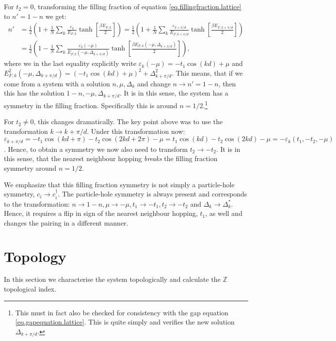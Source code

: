 For $t_2 = 0$, transforming the filling fraction of equation \eqref{eq.fillingfraction.lattice} to $n' = 1 - n$ we get:
\begin{align}
n' 	&= \frac{1}{2}\left(1 + \frac{1}{N}\sum_k \frac{\varepsilon_k}{E_{F,k}}\tanh\left[\frac{\beta E_{F,k}}{2} \right] \right) = \frac{1}{2}\left(1 + \frac{1}{N}\sum_k \frac{\varepsilon_{k + \pi/d}}{E_{F,k + \pi/d}}\tanh\left[\frac{\beta E_{F,k + \pi/d}}{2} \right] \right) \nonumber \\ 
	&= \frac{1}{2}\left(1 - \frac{1}{N}\sum_k \frac{\varepsilon_{k}(-\mu)}{E_{F,k}(-\mu, \Delta_{k + \pi/d})}\tanh\left[\frac{\beta E_{F,k}(-\mu, \Delta_{k + \pi/d})}{2} \right] \right), \nonumber
\end{align}
where we in the last equality explicitly write $\varepsilon_{k}(-\mu) = -t_1\cos(kd) + \mu$ and $E^2_{F,k}(-\mu, \Delta_{k + \pi/d}) = (-t_1\cos(kd)+\mu)^2 + \Delta^2_{k+\pi/d}$. This means, that if we come from a system with a solution $n, \mu, \Delta_k$ and change $n \to n' = 1 - n$, then this has the solution $1 - n, -\mu, \Delta_{k+\pi/d}$. It is in this sense, the system has a symmetry in the filling fraction. Specifically this is around $n = 1/2$.\footnote{This must in fact also be checked for consistency with the gap equation \eqref{eq.gapequation.lattice}. This is quite simply and verifies the new solution $\Delta_{k + \pi/d}$. } 

For $t_2 \neq 0$, this changes dramatically. The key point above was to use the transformation $k\to k + \pi/d$. Under this transformation now: $\varepsilon_{k + \pi/d} = -t_1\cos(kd + \pi) - t_2\cos(2kd + 2\pi) - \mu = t_1\cos(kd) - t_2\cos(2kd) - \mu = -\varepsilon_k(t_1,-t_2,-\mu)$. Hence, to obtain a symmetry we now also need to transform $t_2 \to -t_2$. It is in this sense, that the nearest neighbour hopping \textit{breaks} the filling fraction symmetry around $n = 1/2$. 

We emphasize that this filling fraction symmetry is not simply a particle-hole symmetry, $c_i \to c^\dagger_i$. The particle-hole symmetry is always present and corresponds to the transformation: $n \to 1 - n, \mu \to -\mu, t_1 \to -t_1, t_2 \to -t_2$ and  $\Delta_k \to \Delta_k^*$. Hence, it requires a flip in sign of the nearest neighbour hopping, $t_1$, as well and changes the pairing in a different manner.  

\section{Topology} \label{sec.topology.lattice}
In this section we characterise the system topologically and calculate the $\mathbb{Z}$ topological index. 

